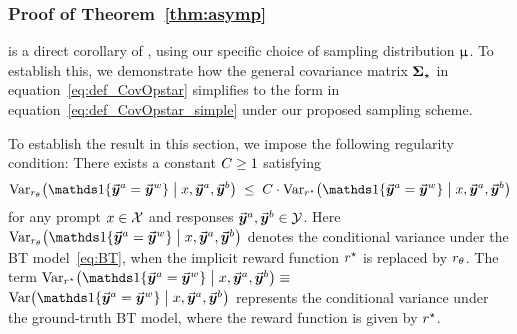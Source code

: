 	

	\subsubsection{Proof of Theorem~\ref{thm:asymp}}
	\label{sec:proof:thm:asymp}
	
	 is a direct corollary of , using our specific choice of sampling distribution $\upmu$. To establish this, we demonstrate how the general covariance matrix $\boldsymbol{\Sigma}_{\star}$ in equation~\eqref{eq:def_CovOpstar} simplifies to the form in equation~\eqref{eq:def_CovOpstar_simple} under our proposed sampling scheme.

    To establish the result in this section, we impose the following regularity condition:
    There exists a constant $C{} \geq 1$ satisfying
    \begin{align}
        \label{eq:last_cond}
        \Var_{\rewardtheta}\big(\indicator\{\responseone = \responsewin\} \bigm| \prompt, \responseone, \responsetwo \big)
        \; \leq \; \Const{} \cdot \Var_{\rewardstar}\big(\indicator\{\responseone = \responsewin\} \bigm| \prompt, \responseone, \responsetwo \big) 
    \end{align}
    for any prompt $x \in \mathcal{X}$ and responses $\vec{\boldsymbol{y}}\!\,^a, \vec{\boldsymbol{y}}\!\,^b \in \mathcal{Y}$.
    Here $\Var_{\rewardtheta}\big(\indicator\{\responseone = \responsewin\} \bigm| \prompt, \responseone, \responsetwo \big)$ denotes the conditional variance under the BT model~\eqref{eq:BT}, when the implicit reward function $r^{\star}$ is replaced by $r_{\theta}$. The term \mbox{$\Var_{\rewardstar}\big(\indicator\{\responseone = \responsewin\} \bigm| \prompt, \responseone, \responsetwo \big)
    \equiv$} \mbox{$\Var\big(\indicator\{\responseone = \responsewin\} \bigm| \prompt, \responseone, \responsetwo \big) $} represents the conditional variance under the ground-truth BT model, where the reward function is given by $r^{\star}$.
	
